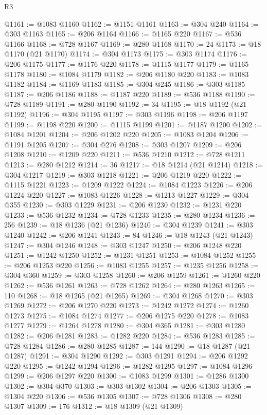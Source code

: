 \begin{lexlean}{R3}
\begin{coremodule}
@1161 := @1083 @1160
@1162 := @1151 @1161
@1163 := @304 @240
@1164 := @303 @1163
@1165 := @206 @1164
@1166 := @1165 @220
@1167 := @536 @1166
@1168 := @728 @1167
@1169 := @280 @1168
@1170 := 24
@1173 := @18 @1170 (@21 @1170)
@1174 := @304 @1173
@1175 := @303 @1174
@1176 := @206 @1175
@1177 := @1176 @220
@1178 := @1115 @1177
@1179 := @1165 @1178
@1180 := @1084 @1179
@1182 := @206 @1180 @220
@1183 := @1083 @1182
@1184 := @1169 @1183
@1185 := @304 @245
@1186 := @303 @1185
@1187 := @206 @1186
@1188 := @1187 @220
@1189 := @536 @1188
@1190 := @728 @1189
@1191 := @280 @1190
@1192 := 34
@1195 := @18 @1192 (@21 @1192)
@1196 := @304 @1195
@1197 := @303 @1196
@1198 := @206 @1197
@1199 := @1198 @220
@1200 := @1115 @1199
@1201 := @1187 @1200
@1202 := @1084 @1201
@1204 := @206 @1202 @220
@1205 := @1083 @1204
@1206 := @1191 @1205
@1207 := @304 @276
@1208 := @303 @1207
@1209 := @206 @1208
@1210 := @1209 @220
@1211 := @536 @1210
@1212 := @728 @1211
@1213 := @280 @1212
@1214 := 36
@1217 := @18 @1214 (@21 @1214)
@1218 := @304 @1217
@1219 := @303 @1218
@1221 := @206 @1219 @220
@1222 := @1115 @1221
@1223 := @1209 @1222
@1224 := @1084 @1223
@1226 := @206 @1224 @220
@1227 := @1083 @1226
@1228 := @1213 @1227
@1229 := @304 @355
@1230 := @303 @1229
@1231 := @206 @1230
@1232 := @1231 @220
@1233 := @536 @1232
@1234 := @728 @1233
@1235 := @280 @1234
@1236 := 256
@1239 := @18 @1236 (@21 @1236)
@1240 := @304 @1239
@1241 := @303 @1240
@1242 := @206 @1241
@1243 := 84
@1246 := @18 @1243 (@21 @1243)
@1247 := @304 @1246
@1248 := @303 @1247
@1250 := @206 @1248 @220
@1251 := @1242 @1250
@1252 := @1231 @1251
@1253 := @1084 @1252
@1255 := @206 @1253 @220
@1256 := @1083 @1255
@1257 := @1235 @1256
@1258 := @304 @360
@1259 := @303 @1258
@1260 := @206 @1259
@1261 := @1260 @220
@1262 := @536 @1261
@1263 := @728 @1262
@1264 := @280 @1263
@1265 := 110
@1268 := @18 @1265 (@21 @1265)
@1269 := @304 @1268
@1270 := @303 @1269
@1272 := @206 @1270 @220
@1273 := @1242 @1272
@1274 := @1260 @1273
@1275 := @1084 @1274
@1277 := @206 @1275 @220
@1278 := @1083 @1277
@1279 := @1264 @1278
@1280 := @304 @365
@1281 := @303 @1280
@1282 := @206 @1281
@1283 := @1282 @220
@1284 := @536 @1283
@1285 := @728 @1284
@1286 := @280 @1285
@1287 := 144
@1290 := @18 @1287 (@21 @1287)
@1291 := @304 @1290
@1292 := @303 @1291
@1294 := @206 @1292 @220
@1295 := @1242 @1294
@1296 := @1282 @1295
@1297 := @1084 @1296
@1299 := @206 @1297 @220
@1300 := @1083 @1299
@1301 := @1286 @1300
@1302 := @304 @370
@1303 := @303 @1302
@1304 := @206 @1303
@1305 := @1304 @220
@1306 := @536 @1305
@1307 := @728 @1306
@1308 := @280 @1307
@1309 := 176
@1312 := @18 @1309 (@21 @1309)

\end{coremodule}
\end{lexlean}

